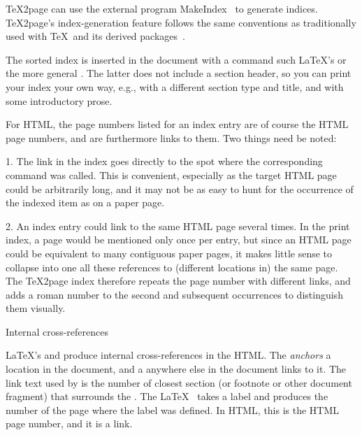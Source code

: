 %
\TeX2page can use the external program
MakeIndex~\cite{ind,makeindex} to generate indices.
\TeX2page’s index-generation feature follows the same
conventions as traditionally used with \TeX\ and its
derived packages~\cite[sec.~4.5 \& appendix~A]{latex}.

The sorted index is inserted in the document with a
command such \LaTeX’s \p{\printindex} or the more
general .  The latter does not include a
section header, so you can print your index your own
way, e.g., with a different section type and title, and
with some introductory prose.

For HTML, the page numbers listed for an index entry are
of course the HTML page numbers, and are furthermore
links to them.  Two things need be noted:

\item{1.}  The link in the index goes directly to the spot where
the corresponding \p{\index} command was called.  This
is convenient, especially as the target HTML page could
be arbitrarily long, and it may not be as easy to hunt
for the occurrence of the indexed item as on a paper
page.

\item{2.} An index entry could link to the same HTML page
several times.  In the print index, a page would be mentioned
only once per entry, but since an HTML page could
be equivalent to many contiguous paper pages, it makes
little sense to collapse into one all these references to
(different locations in) the same page.  The \TeX2page
index therefore repeats the page number with different
links, and adds a roman number to the second and
subsequent occurrences to distinguish them visually.

\beginsection Internal cross-references

\LaTeX’s \p{\label} and \p{\ref} produce internal
cross-references in the HTML.  The \p{\label} {\em anchors}
a location in the document, and a \p{\ref} anywhere
else in the document links to it.  The link text used
by \p{\ref} is the number of closest section (or footnote or other
document fragment) that surrounds the \p{\label}.
The \LaTeX\ \p{\pageref} takes a label and produces the
number of the page where the label was defined.  In
HTML, this is the HTML page number, and it is a link.

